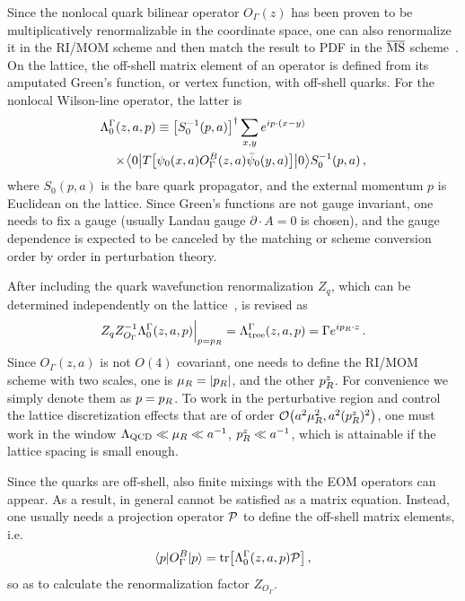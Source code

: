 Since the nonlocal quark bilinear operator $O_\Gamma(z)$ has been proven to be multiplicatively renormalizable in the coordinate space, one can also renormalize it in the RI/MOM scheme and then match the result to PDF in the ${\overline{\rm MS}}$ scheme~\cite{Constantinou:2017sej,Stewart:2017tvs}.
On the lattice, the off-shell matrix element of an operator is defined from its amputated Green's function, or vertex function, with off-shell quarks. For the nonlocal Wilson-line operator, the latter is
\begin{align} \label{eq:Lambda}
	&\Lambda^{\Gamma}_0(z, a, p) \equiv
	\left[S^{-1}_0(p,a)\right]^\dagger \sum_{x,y}e^{ip\cdot (x-y)}
	\nonumber\\
	&\ \ \  \times\! \big\langle 0 \big|T\bigl[\psi_0(x,a) O^B_\Gamma(z,a) \bar{\psi}_0(y,a)\bigr]\big|0\big\rangle S^{-1}_0(p,a)\,,
\end{align}
where $S_0(p,a)$ is the bare quark propagator, and the external momentum $p$ is Euclidean on the lattice.
Since Green's functions are not gauge invariant, one needs to fix a gauge (usually Landau gauge $\partial\cdot  A=0$ is chosen), and the gauge dependence is expected to be canceled by the matching or scheme conversion order by order in perturbation theory.

After including the quark wavefunction renormalization $Z_q$, which can be determined independently on the lattice~\cite{Martinelli:1994ty},  is revised as
\begin{align} \label{eq:rimomvertex}
	Z_q Z^{-1}_{O_\Gamma} \Lambda^{\Gamma}_0(z,a,p)\Big|_{p=p_{\tiny R}}= \Lambda^{\Gamma}_{\rm tree}(z,a,p) = \Gamma e^{ip_{\tiny R}\cdot z}\,.
\end{align}
Since $O_\Gamma(z,a)$ is not $O(4)$ covariant, one needs to define the RI/MOM scheme with two scales, one is $\mu_{\tiny R}=|p_R|$, and the other $p_{\tiny R}^z$. For convenience we simply denote them as $p=p_{\tiny R}$. To work in the perturbative region and control the lattice discretization effects that are of order ${\cal O}\big(a^2\mu_{\tiny R}^2, a^2(p_{\tiny R}^z)^2\big)$, one must work in the window $\Lambda_{\rm QCD}\ll \mu_{\tiny R}\ll a^{-1}$, $p_{\tiny R}^z \ll a^{-1}$, which is attainable if the lattice spacing is small enough.

Since the quarks are off-shell, also finite mixings with the EOM operators can appear. As a result,  in general cannot be satisfied as a matrix equation. Instead, one usually needs a projection operator ${\cal P}$ to define the off-shell matrix elements, i.e.
\begin{align}
	\langle p| O^B_\Gamma |p\rangle = {\rm tr}\big[\Lambda^{\Gamma}_0(z,a,p) {\cal P}\big]\,,
\end{align}
so as to calculate the renormalization factor $Z_{O_\Gamma}$.

